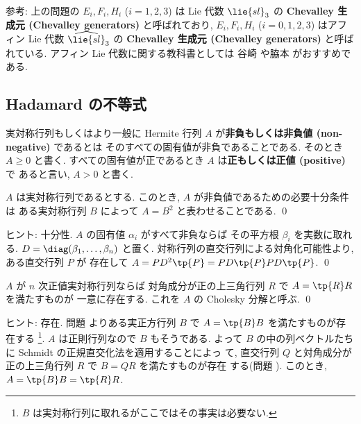 \documentclass[12pt,twoside]{jarticle}
\begin{document}
\noindent
参考: 上の問題の $E_i,F_i,H_i$ ($i=1,2,3$) は Lie 代数 $\lie{sl}_3$ の 
{\bf Chevalley 生成元 (Chevalley generators)} と呼ばれており, 
$E_i,F_i,H_i$ ($i=0,1,2,3$) はアフィン Lie 代数 $\widehat{\lie{sl}}_3$ の
{\bf Chevalley 生成元 (Chevalley generators)} と呼ばれている.
アフィン Lie 代数に関する教科書としては
谷崎 \cite{tanisaki} や脇本 \cite{wakimoto} がおすすめである. 


\subsection{Hadamard の不等式}


実対称行列もしくはより一般に Hermite 行列 $A$ 
が{\bf 非負もしくは非負値 (non-negative)} であるとは
そのすべての固有値が非負であることである. 
そのとき $A\ge 0$ と書く.  
すべての固有値が正であるとき $A$ は{\bf 正もしくは正値 (positive)} で
あると言い, $A>0$ と書く.

\begin{question}
\label{q:positive-symmetric}
  $A$ は実対称行列であるとする. 
  このとき, $A$ が非負値であるための必要十分条件は
  ある実対称行列 $B$ によって $A=B^2$ と表わせることである. \qed
\end{question}

\noindent
ヒント: 十分性.  $A$ の固有値 $\alpha_i$ がすべて非負ならば
その平方根 $\beta_i$ を実数に取れる.
$D=\diag(\beta_1,\dots,\beta_n)$ と置く.
対称行列の直交行列による対角化可能性より, ある直交行列 $P$ が
存在して $A=PD^2\tp{P}=PD\tp{P}PD\tp{P}$.
\qed


\begin{question}[Cholesky 分解]
\label{q:pos-sym=RR}
  $A$ が $n$ 次正値実対称行列ならば
  対角成分が正の上三角行列 $R$ で $A=\tp{R}R$ を満たすものが
  一意に存在する.  これを $A$ の Cholesky 分解と呼ぶ.
  \qed
\end{question}

\noindent
ヒント: 存在. 問題  よりある実正方行列 $B$
で $A=\tp{B}B$ を満たすものが存在する%
\footnote{$B$ は実対称行列に取れるがここではその事実は必要ない.}.
$A$ は正則行列なので $B$ もそうである. 
よって $B$ の中の列ベクトルたちに Schmidt の正規直交化法を適用することによっ
て, 直交行列 $Q$ と対角成分が正の上三角行列 $R$ で $B=QR$ を満たすものが存在
する(問題 ).  
このとき, $A=\tp{B}B=\tp{R}R$.
\end{document}
